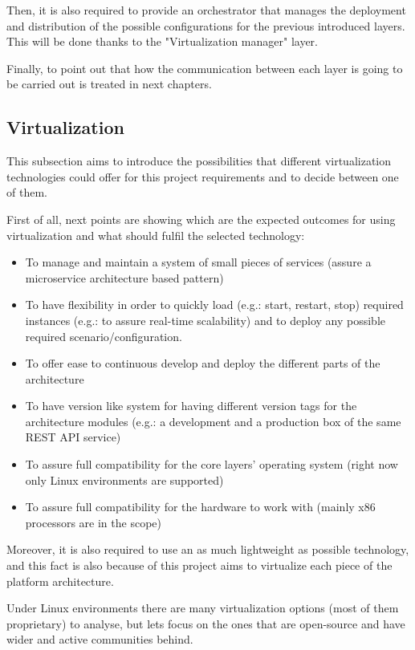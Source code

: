 Then, it is also required to provide an orchestrator that manages the deployment and distribution of the possible configurations for the previous introduced layers. This will be done thanks to the "Virtualization manager" layer.

Finally, to point out that how the communication between each layer is going to be carried out is treated in next chapters.

\subsection{Virtualization}

This subsection aims to introduce the possibilities that different virtualization technologies could offer for this project requirements and to decide between one of them.

First of all, next points are showing which are the expected outcomes for using virtualization and what should fulfil the selected technology:

\begin{itemize}
\item To manage and maintain a system of small pieces of services (assure a microservice architecture based pattern)
\item To have flexibility in order to quickly load (e.g.: start, restart, stop) required instances (e.g.: to assure real-time scalability) and to deploy any possible required scenario/configuration.
\item To offer ease to continuous develop and deploy the different parts of the architecture
\item To have version like system for having different version tags for the architecture modules (e.g.: a development and a production box of the same REST API service)
\item To assure full compatibility for the core layers' operating system (right now only Linux environments are supported)
\item To assure full compatibility for the hardware to work with (mainly x86 processors are in the scope)
\end{itemize}

Moreover, it is also required to use an as much lightweight as possible technology, and this fact is also because of this project aims to virtualize each piece of the platform architecture.

Under Linux environments there are many virtualization options (most of them proprietary) to analyse, but lets focus on the ones that are open-source and have wider and active communities behind.

